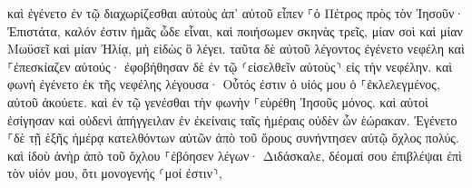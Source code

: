 \documentclass{openreader}
\begin{document}
καὶ ἐγένετο ἐν τῷ διαχωρίζεσθαι αὐτοὺς ἀπ’ αὐτοῦ εἶπεν ⸀ὁ Πέτρος πρὸς τὸν Ἰησοῦν· Ἐπιστάτα, καλόν ἐστιν ἡμᾶς ὧδε εἶναι, καὶ ποιήσωμεν σκηνὰς τρεῖς, μίαν σοὶ καὶ μίαν Μωϋσεῖ καὶ μίαν Ἠλίᾳ, μὴ εἰδὼς ὃ λέγει. 
ταῦτα δὲ αὐτοῦ λέγοντος ἐγένετο νεφέλη καὶ ⸀ἐπεσκίαζεν αὐτούς· ἐφοβήθησαν δὲ ἐν τῷ ⸂εἰσελθεῖν αὐτοὺς⸃ εἰς τὴν νεφέλην. 
καὶ φωνὴ ἐγένετο ἐκ τῆς νεφέλης λέγουσα· Οὗτός ἐστιν ὁ υἱός μου ὁ ⸀ἐκλελεγμένος, αὐτοῦ ἀκούετε. 
καὶ ἐν τῷ γενέσθαι τὴν φωνὴν ⸀εὑρέθη Ἰησοῦς μόνος. καὶ αὐτοὶ ἐσίγησαν καὶ οὐδενὶ ἀπήγγειλαν ἐν ἐκείναις ταῖς ἡμέραις οὐδὲν ὧν ἑώρακαν. 
Ἐγένετο ⸀δὲ τῇ ἑξῆς ἡμέρᾳ κατελθόντων αὐτῶν ἀπὸ τοῦ ὄρους συνήντησεν αὐτῷ ὄχλος πολύς. 
καὶ ἰδοὺ ἀνὴρ ἀπὸ τοῦ ὄχλου ⸀ἐβόησεν λέγων· Διδάσκαλε, δέομαί σου ἐπιβλέψαι ἐπὶ τὸν υἱόν μου, ὅτι μονογενής ⸂μοί ἐστιν⸃, 
\end{document}

